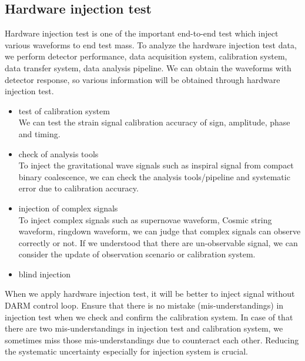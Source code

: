\subsection{Hardware injection test}
Hardware injection test is one of the important end-to-end test which 
inject various waveforms to end test mass.
To analyze the hardware injection test data, we perform 
detector performance, data acquisition system, calibration system, 
data transfer system, data analysis pipeline.
We can obtain the waveforms with detector response, so 
various information will be obtained through hardware injection test.
\begin{itemize}
\item test of calibration system\\
We can test the strain signal calibration accuracy of 
sign, amplitude, phase and timing.
\item check of analysis tools\\
To inject the gravitational wave signals such as inspiral signal from 
compact binary coalescence, we can check the analysis tools/pipeline 
and systematic error due to calibration accuracy.
\item injection of complex signals\\
To inject complex signals such as supernovae waveform, Cosmic string waveform, ringdown waveform, 
we can judge that complex signals can observe correctly or not. 
If we understood that there are un-observable signal, we can consider the update of observation scenario or
calibration system.
\item blind injection\\
\end{itemize}
When we apply hardware injection test, it will be better to inject signal without DARM control loop.
Ensure that there is no mistake (mis-understandings) in injection test 
when we check and confirm the calibration system.
In case of that there are two mis-understandings in injection test and calibration system, 
we sometimes miss those mis-understandings due to counteract each other. 
Reducing the systematic uncertainty especially for injection system is crucial.
